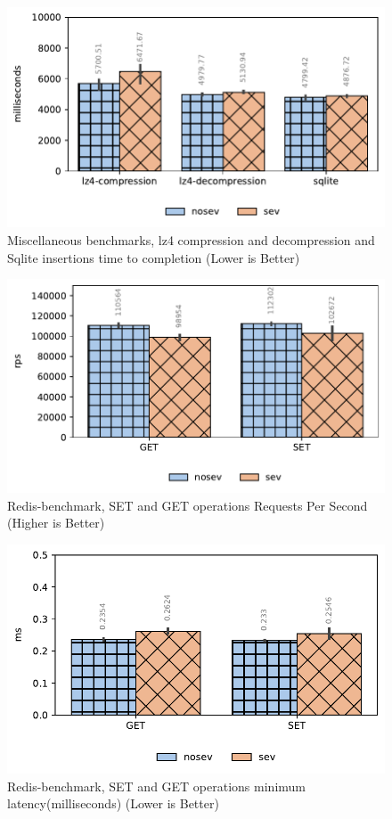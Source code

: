 \documentclass[twocolumn]{article}
\begin{document}
\begin{figure}[ht]
    \centering
    \includegraphics[width=\columnwidth]{img/misc.pdf}
    \caption{Miscellaneous benchmarks, lz4 compression and decompression and Sqlite insertions time to completion (Lower is Better)}
    \label{fig:tb-misc}
\end{figure}

\begin{figure}[ht]
    \centering
    \includegraphics[width=\columnwidth]{img/redis.pdf}
    \caption{Redis-benchmark, SET and GET operations Requests Per Second (Higher is Better)}
    \label{fig:tb-redis}
\end{figure}

\begin{figure}[ht]
    \centering
    \includegraphics[width=\columnwidth]{img/redis-latency.pdf}
    \caption{Redis-benchmark, SET and GET operations minimum latency(milliseconds) (Lower is Better)}
    \label{fig:tb-redis-latency}
\end{figure}
\end{document}
